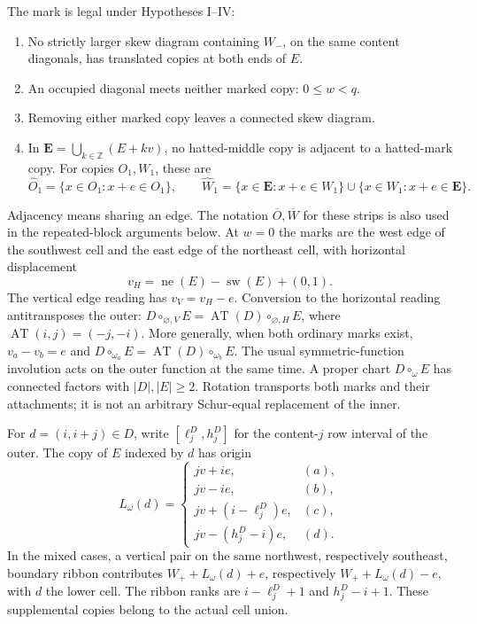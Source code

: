 \documentclass[11pt,a4paper]{amsart}
\numberwithin{equation}{section}
\theoremstyle{plain}
\theoremstyle{definition}
\begin{document}
The mark is legal under Hypotheses I--IV:
\begin{enumerate}
\item[(I)] No strictly larger skew diagram containing \(W_-\), on the
 same content diagonals, has translated copies at both ends of \(E\).
\item[(II)] An occupied diagonal meets neither marked copy: \(0\le w<q\).
\item[(III)] Removing either marked copy leaves a connected skew diagram.
\item[(IV)] In \(\boldsymbol E=\bigcup_{k\in\mathbb Z}(E+kv)\), no
 hatted-middle copy is adjacent to a hatted-mark copy.  For copies
 \(O_1,W_1\), these are
 \[
 \widehat O_1=\{x\in O_1:x+e\in O_1\},\qquad
 \widehat W_1=\{x\in\boldsymbol E:x+e\in W_1\}
       \cup\{x\in W_1:x+e\in\boldsymbol E\}.
 \]
\end{enumerate}
Adjacency means sharing an edge.  The notation \(\overline O,\overline W\)
for these strips is also used in the repeated-block arguments below.
At \(w=0\) the marks are the west edge of the southwest cell and the east
edge of the northeast cell, with horizontal displacement
\[
 v_H=\operatorname{ne}(E)-\operatorname{sw}(E)+(0,1).
\]
The vertical edge reading has \(v_V=v_H-e\).  Conversion to the
horizontal reading antitransposes the outer:
\(D\circ_{\varnothing,V}E=\operatorname{AT}(D)\circ_{\varnothing,H}E\),
where \(\operatorname{AT}(i,j)=(-j,-i)\).
More generally, when both ordinary marks exist, \(v_a-v_b=e\) and
\(D\circ_{\omega_a}E=\operatorname{AT}(D)\circ_{\omega_b}E\).
The usual symmetric-function involution acts on the outer function at
the same time.  A proper chart \(D\circ_\omega E\) has connected factors
with \(|D|,|E|\ge2\).  Rotation transports both marks and their attachments;
it is not an arbitrary Schur-equal replacement of the inner.

For \(d=(i,i+j)\in D\), write \([\ell_j^D,h_j^D]\) for the
content-\(j\) row interval of the outer.  The copy of \(E\) indexed by
\(d\) has origin
\[
 L_\omega(d)=
 \begin{cases}
 jv+ie,&(a),\\
 jv-ie,&(b),\\
 jv+(i-\ell_j^D)e,&(c),\\
 jv-(h_j^D-i)e,&(d).
 \end{cases}
\]
In the mixed cases, a vertical pair on the same northwest, respectively
southeast, boundary ribbon contributes
\(W_++L_\omega(d)+e\), respectively \(W_++L_\omega(d)-e\),
with \(d\) the lower cell.  The ribbon ranks are
\(i-\ell_j^D+1\) and \(h_j^D-i+1\).  These supplemental copies belong
to the actual cell union.
\end{document}
